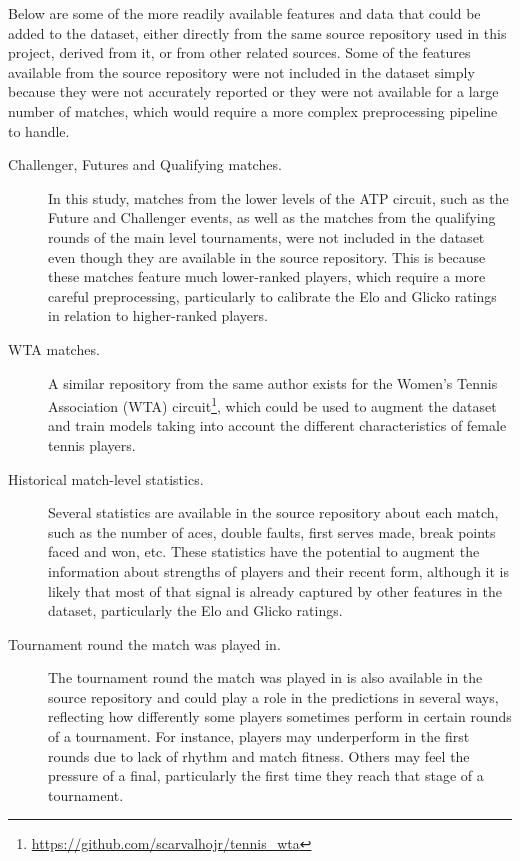 Below are some of the more readily available features and data that could be added to the dataset,
either directly from the same source repository used in this project, derived from it, or from other
related sources. Some of the features available from the source repository were not included in the
dataset simply because they were not accurately reported or they were not available for a large
number of matches, which would require a more complex preprocessing pipeline to handle.

\begin{description}
  \item[Challenger, Futures and Qualifying matches.] In this study, matches from the lower levels
  of the ATP circuit, such as the Future and Challenger events, as well as the matches from the
  qualifying rounds of the main level tournaments, were not included in the dataset even though they
  are available in the source repository. This is because these matches feature much lower-ranked
  players, which require a more careful preprocessing, particularly to calibrate the
  Elo and Glicko ratings in relation to higher-ranked players.

  \item[WTA matches.] A similar repository from the same author exists for the Women's Tennis
  Association (WTA) circuit\footnote{\url{https://github.com/scarvalhojr/tennis_wta}}, which could
  be used to augment the dataset and train models taking into account the different characteristics
  of female tennis players.

  \item[Historical match-level statistics.] Several statistics are available in the source
  repository about each match, such as the number of aces, double faults, first serves made, break
  points faced and won, etc. These statistics have the potential to augment the information about
  strengths of players and their recent form, although it is likely that most of that signal is
  already captured by other features in the dataset, particularly the Elo and Glicko ratings.

  \item[Tournament round the match was played in.] The tournament round the match was played in is
  also available in the source repository and could play a role in the predictions in several ways,
  reflecting how differently some players sometimes perform in certain rounds of a tournament. For
  instance, players may underperform in the first rounds due to lack of rhythm and match
  fitness. Others may feel the pressure of a final, particularly the first time they reach that
  stage of a tournament.


\end{description}
